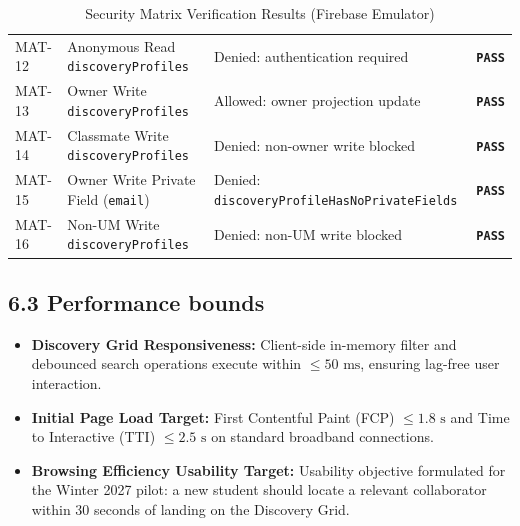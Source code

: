 \documentclass[11pt,letterpaper]{article}
\begin{document}
\begin{table}[h!]
\begin{tabularx}{\textwidth}{p{1.4cm} L{5.8cm} L{4.5cm} p{1.6cm}}
MAT-12 & Anonymous Read \texttt{discoveryProfiles} & Denied: authentication required & \textbf{\texttt{PASS}} \\
MAT-13 & Owner Write \texttt{discoveryProfiles} & Allowed: owner projection update & \textbf{\texttt{PASS}} \\
MAT-14 & Classmate Write \texttt{discoveryProfiles} & Denied: non-owner write blocked & \textbf{\texttt{PASS}} \\
MAT-15 & Owner Write Private Field (\texttt{email}) & Denied: \texttt{discoveryProfileHasNoPrivateFields} & \textbf{\texttt{PASS}} \\
MAT-16 & Non-UM Write \texttt{discoveryProfiles} & Denied: non-UM write blocked & \textbf{\texttt{PASS}} \\
\bottomrule
\end{tabularx}
\caption{Security Matrix Verification Results (Firebase Emulator)}
\label{tab:sec-matrix-results}
\end{table}

\subsection*{6.3 Performance bounds}
\begin{itemize}[leftmargin=*,noitemsep]
\item \textbf{Discovery Grid Responsiveness:} Client-side in-memory filter and debounced search operations execute within $\le 50\text{ ms}$, ensuring lag-free user interaction.
\item \textbf{Initial Page Load Target:} First Contentful Paint (FCP) $\le 1.8\text{ s}$ and Time to Interactive (TTI) $\le 2.5\text{ s}$ on standard broadband connections.
\item \textbf{Browsing Efficiency Usability Target:} Usability objective formulated for the Winter 2027 pilot: a new student should locate a relevant collaborator within 30 seconds of landing on the Discovery Grid.
\end{itemize}
\end{document}
